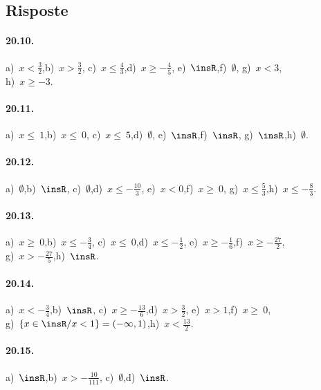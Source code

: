 \subsection{Risposte}
\paragraph{20.10.} a)~$x<\frac{3}{2}$,\quad b)~$x>\frac{3}{2}$,\quad
c)~$x\le \frac{4}{3}$,\quad d)~$x\ge -{\frac{4}{5}}$,\quad
e)~$\insR$,\quad f)~$\emptyset $,\quad
g)~$x<3$,\quad \protect\\ h)~$x\ge -3$.

\paragraph{20.11.} a)~$x\le~1$,\quad b)~$x\le~0$,\quad
c)~$x\le~5$,\quad d)~$\emptyset $,\quad
e)~$\insR$,\quad f)~$\insR$,\quad
g)~$\insR $,\quad h)~$\emptyset $.

\paragraph{20.12.} a)~$\emptyset $,\quad b)~$\insR$,\quad
c)~$\emptyset $,\quad d)~$x\le -{\frac{10}{3}}$,\quad
e)~$x<0$,\quad f)~$x\ge~0$,\quad
g)~$x\le \frac{5}{3}$,\quad h)~$x\le -{\frac{8}{3}}$.

\paragraph{20.13.} a)~$x\ge~0$,\quad b)~$x\le -{\frac{3}{4}}$,\quad
c)~$x\le~0$,\quad d)~$x\le -{\frac{1}{2}}$,\quad
e)~$x\ge -{\frac{1}{6}}$,\quad f)~$x\ge -{\frac{27}{2}}$,\quad
\protect\\g)~$x>-{\frac{27}{5}}$,\quad h)~$\insR$.

\paragraph{20.14.} a)~$x<-{\frac{3}{4}}$,\quad b)~$\insR$,\quad
c)~$x\ge -{\frac{13}{6}}$,\quad d)~$x>\frac{3}{2}$,\quad
e)~$x>1$,\quad f)~$x\ge~0$,\quad\protect\\
g)~$\{x\in\insR/x<1\}=(-\infty,1)$,\quad h)~$x<\frac{13}{2}$.

\paragraph{20.15.} a)~$\insR$,\quad b)~$x>-{\frac{10}{111}}$,\quad
c)~$\emptyset $,\quad d)~$\insR$.

